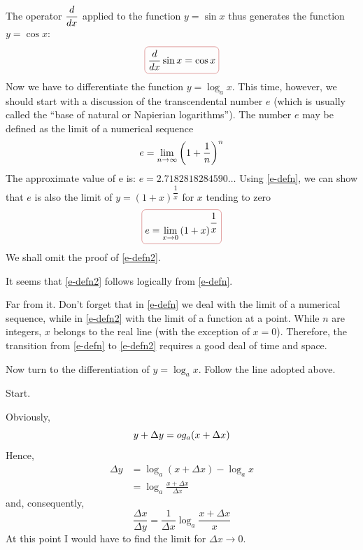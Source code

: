 \athr The operator $\dfrac{d}{dx}$ applied to the function $y = \sin x$ thus generates the function $y = \cos x$:
\begin{equation}%
\boxed{ \ddx \sin x = \cos x}
\label{deriv-sin}
\end{equation}
Now we have to differentiate the function $y = \log_{a} x$. This time, however, we should start with a discussion of the transcendental number $e$ (which is usually called the ``base of natural or Napierian logarithms''). The number $e$ may be defined as the limit of a numerical sequence
\begin{equation}%
e  = \lmts{n}{\infty} \left( 1 + \frac{1}{n} \right)^{n}
\label{e-defn}
\end{equation}
The approximate value of e is: $e = \num{2.7182818284590}\ldots$
Using \eqref{e-defn}, we can show that $e$ is also the limit of $y = (1 + x)^{\dfrac{1}{x}}$ for $x$ tending to zero 
\begin{equation}%
\boxed{e  = \lmts{x}{0} \left( 1 + x \right)^{\dfrac{1}{x}}}
\label{e-defn2}
\end{equation}
We shall omit the proof of \eqref{e-defn2}. 

\rdr It seems that \eqref{e-defn2} follows logically from \eqref{e-defn}. 

\athr Far from it. Don't forget that in \eqref{e-defn} we deal
with the limit of a numerical sequence, while in \eqref{e-defn2} with the limit of a function at a point. While $n$ are integers, $x$ belongs to the real line (with the exception of $x = 0$). Therefore, the transition from \eqref{e-defn} to \eqref{e-defn2} requires a good deal of time and space.

Now turn to the differentiation of $y = \log_{a} x$. Follow the line adopted above. 

Start.

\rdr Obviously,
\begin{equation*}%
y + \Delta y = \\og_{a} (x+ \Delta x)
\end{equation*}
Hence,
\begin{align*}%
\Delta y & = \log_{a} (x+ \Delta x) -  \log_{a} x\\
& = \log_{a} \frac{x+ \Delta x}{ \Delta x}
\end{align*}
and, consequently,
\begin{equation*}%
\frac{\Delta x}{\Delta y} = \dfrac{ 1}{\Delta x} \log_{a} \frac{x + \Delta x}{x}
\end{equation*}
At this point I would have to find the limit for $\Delta x \to 0$. 

